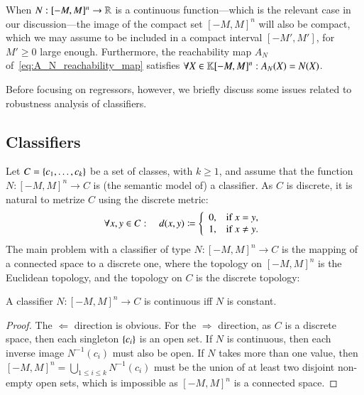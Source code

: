 \documentclass[11pt,times]{article}
\begin{document}
  
  When $N: [-M,M]^n \to \mathbb{R}$ is a continuous function---which is the
  relevant case in our discussion---the image of the compact set
  $[-M,M]^n$ will also be compact, which we may assume to be included
  in a compact interval $[-M',M']$, for $M' \geq 0$ large
  enough. Furthermore, the reachability map $A_N$
  of~\eqref{eq:A_N_reachability_map} satisfies
  $\forall X \in \mathbb{K}[-M,M]^n: A_N(X) = N(X)$.

  Before focusing on regressors, however, we briefly discuss some
  issues related to robustness analysis of classifiers.

  

  \subsection{Classifiers}
\label{subsec:classifiers}


Let $C = \left\{{c_1, \ldots, c_k}\right\}$ be a set of classes, with $k \geq 1$,
and assume that the function $N: [-M,M]^n \to C$ is (the semantic model
of) a classifier. As $C$ is discrete, it is natural to metrize $C$
using the discrete metric:
%
\begin{equation*}
  \forall x,y \in C: \quad  d(x,y) \coloneqq
  \left\{
    \begin{array}{ll}
      0, & \text{if } x = y,\\
      1, & \text{if } x \neq y.\\
    \end{array}
  \right.
\end{equation*}
%
\noindent
The main problem with a classifier of type $N : [-M,M]^n \to C$ is the
mapping of a connected space to a discrete one, where the topology on
$[-M,M]^n$ is the Euclidean topology, and the topology on $C$ is the
discrete topology:


\begin{proposition}
\label{prop:classifier_cont_constant}
A classifier $N: [-M,M]^n \to C$ is continuous iff $N$ is constant.
\end{proposition}



\begin{proof}
  The $\Leftarrow$ direction is obvious. For the $\Rightarrow$
  direction, as $C$ is a discrete space, then each singleton
  $\left\{{c_i}\right\}$ is an open set. If $N$ is continuous, then each inverse
  image $N^{-1}(c_i)$ must also be open. If $N$ takes more than one
  value, then $[-M,M]^n = \bigcup_{1 \leq i \leq k} N^{-1}(c_i)$ must be
  the union of at least two disjoint non-empty open sets, which is
  impossible as $[-M,M]^n$ is a connected space.
\end{proof}
\end{document}
